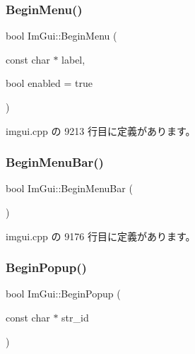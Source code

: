 \mbox{\label{namespace_im_gui_a1e55711a21f97d5dff919d697d3a7201}} 
\subsubsection{\texorpdfstring{Begin\+Menu()}{BeginMenu()}}
{\footnotesize\ttfamily bool Im\+Gui\+::\+Begin\+Menu (\begin{DoxyParamCaption}\item[{const char $\ast$}]{label,  }\item[{bool}]{enabled = {\ttfamily true} }\end{DoxyParamCaption})}



 imgui.\+cpp の 9213 行目に定義があります。

\mbox{\label{namespace_im_gui_a4852dff802922163fc747e2e0df5b88f}} 
\subsubsection{\texorpdfstring{Begin\+Menu\+Bar()}{BeginMenuBar()}}
{\footnotesize\ttfamily bool Im\+Gui\+::\+Begin\+Menu\+Bar (\begin{DoxyParamCaption}{ }\end{DoxyParamCaption})}



 imgui.\+cpp の 9176 行目に定義があります。

\mbox{\label{namespace_im_gui_ab71527de4b52ff970e5396040302e134}} 
\subsubsection{\texorpdfstring{Begin\+Popup()}{BeginPopup()}}
{\footnotesize\ttfamily bool Im\+Gui\+::\+Begin\+Popup (\begin{DoxyParamCaption}\item[{const char $\ast$}]{str\+\_\+id }\end{DoxyParamCaption})}



